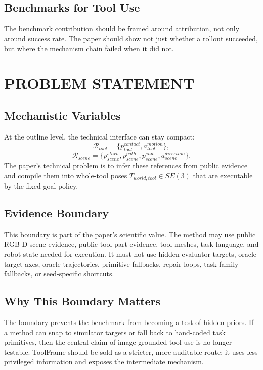 \documentclass[letterpaper, 10 pt, conference]{ieeeconf}
\newcommand{\method}{ToolFrame}
\begin{document}
\subsection{Benchmarks for Tool Use}
The benchmark contribution should be framed around attribution, not only around
success rate. The paper should show not just whether a rollout succeeded, but
where the mechanism chain failed when it did not.

\section{PROBLEM STATEMENT}

\subsection{Mechanistic Variables}
At the outline level, the technical interface can stay compact:
\begin{equation}
  \mathcal{R}_{tool} =
  \{p^{contact}_{tool}, a^{motion}_{tool}\},
\end{equation}
\begin{equation}
  \mathcal{R}_{scene} =
  \{p^{start}_{scene}, p^{path}_{scene}, p^{end}_{scene},
  a^{direction}_{scene}\}.
\end{equation}
The paper's technical problem is to infer these references from public
evidence and compile them into whole-tool poses
$T_{world,tool}\in SE(3)$ that are executable by the fixed-goal policy.

\subsection{Evidence Boundary}
This boundary is part of the paper's scientific value. The method may use
public RGB-D scene evidence, public tool-part evidence, tool meshes, task
language, and robot state needed for execution. It must not use hidden
evaluator targets, oracle target axes, oracle trajectories, primitive
fallbacks, repair loops, task-family fallbacks, or seed-specific shortcuts.

\subsection{Why This Boundary Matters}
The boundary prevents the benchmark from becoming a test of hidden priors. If a
method can snap to simulator targets or fall back to hand-coded task
primitives, then the central claim of image-grounded tool use is no longer
testable. \method{} should be sold as a stricter, more auditable route: it uses
less privileged information and exposes the intermediate mechanism.
\end{document}
